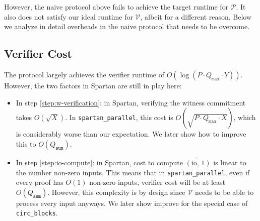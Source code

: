 \documentclass{article}
\newcommand{\code}{\texttt}
\newcommand{\Qsum}{Q_{\mathtt{sum}}}
\newcommand{\Qmax}{Q_{\mathtt{max}}}
\renewcommand{\P}{\mathcal{P}}
\newcommand{\V}{\mathcal{V}}
\newcommand{\io}{\widetilde{(\mbox{io, 1})}}
\begin{document}
However, the naive protocol above fails to achieve the target runtime for $\P$. It also does not satisfy our ideal runtime for $\V$, albeit for a different reason. Below we analyze in detail overheads in the naive protocol that needs to be overcome.

\subsection{Verifier Cost}
The protocol largely achieves the verifier runtime of $O(\log(P \cdot \Qmax \cdot Y))$. However, the two factors in Spartan are still in play here:
\begin{itemize}
    \item In step \ref{step:w-verification}: in Spartan, verifying the witness commitment takes $O(\sqrt{X})$. In \code{spartan\_parallel}, this cost is $O(\sqrt{P\cdot \Qmax\cdot X})$, which is considerably worse than our expectation. We later show how to improve this to $O(\Qsum)$.
    \item In step \ref{step:io-compute}: in Spartan, cost to compute $\io$ is linear to the number non-zero inputs. This means that in \code{spartan\_parallel}, even if every proof has $O(1)$ non-zero inputs, verifier cost will be at least $O(\Qsum)$. However, this complexity is by design since $\V$ needs to be able to process every input anyways. We later show improve for the special case of \code{circ\_blocks}.
\end{itemize}
\end{document}
